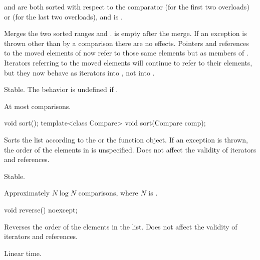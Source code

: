 \begin{itemdescr}
\pnum
\requires {} and  are both sorted with respect to
the comparator  (for the first two overloads) or
 (for the last two overloads), and
 is .

\pnum
\effects Merges the two sorted ranges \tcode{[begin(), end())} and
\tcode{[x.begin(), x.end())}.  is empty after the merge. If an
exception is thrown other than by a comparison there are no effects.
Pointers and references to the moved elements of  now refer to those same elements
but as members of . Iterators referring to the moved elements will continue to
refer to their elements, but they now behave as iterators into , not into
.

\pnum
\remarks Stable. The behavior is undefined if
.

\pnum
\complexity At most  comparisons.
\end{itemdescr}

%
\begin{itemdecl}
void sort();
template<class Compare> void sort(Compare comp);
\end{itemdecl}

\begin{itemdescr}
\pnum
\effects Sorts the list according to the  or the  function object.
If an exception is thrown, the order of the elements in  is unspecified.
Does not affect the validity of iterators and references.

\pnum
\remarks Stable.

\pnum
\complexity Approximately $N \log N$ comparisons, where $N$ is .
\end{itemdescr}

%
\begin{itemdecl}
void reverse() noexcept;
\end{itemdecl}

\begin{itemdescr}
\pnum
\effects Reverses the order of the elements in the list.
Does not affect the validity of iterators and references.

\pnum
\complexity Linear time.
\end{itemdescr}

